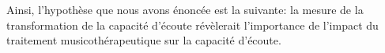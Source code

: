 
 


 

 Ainsi, l'hypothèse que nous avons énoncée est la suivante:%
  la  mesure de la  
 transformation de la capacité d'écoute révèlerait  l'importance de l'impact  du traitement 
 musicothérapeutique sur 
 la capacité d'écoute.











